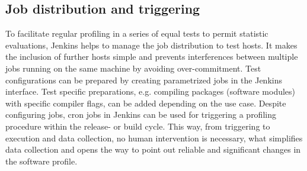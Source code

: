 \documentclass[a4paper]{jpconf}
\begin{document}
\subsection{Job distribution and triggering}
\label{sec:job_distribution}

To facilitate regular profiling in a series of equal tests to permit statistic evaluations, Jenkins helps to manage the job distribution to test hosts. It makes the inclusion of further hosts simple and prevents interferences between multiple jobs running on the same machine by avoiding over-commitment. Test configurations can be prepared by creating parametrized jobs in the Jenkins interface. Test specific preparations, e.g. compiling packages (software modules) with specific compiler flags, can be added depending on the use case.
\newline
Despite configuring jobs, cron jobs in Jenkins can be used for triggering a profiling procedure within the release- or build cycle. This way, from triggering to execution and data collection, no human intervention is necessary, what simplifies data collection and opens the way to point out reliable and significant changes in the software profile.


\end{document}
